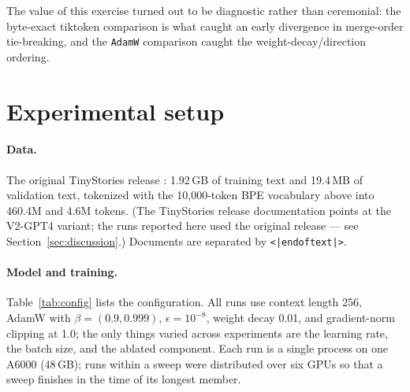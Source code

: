 \documentclass{article}
\newcommand{\eot}{\texttt{<|endoftext|>}}
\begin{document}
The value of this exercise turned out to be diagnostic rather than ceremonial: the byte-exact tiktoken comparison is what caught an early divergence in merge-order tie-breaking, and the \texttt{AdamW} comparison caught the weight-decay/direction ordering.

\section{Experimental setup}
\label{sec:setup}

\paragraph{Data.} The original TinyStories release \citep{tinystories}: 1.92\,GB of training text and 19.4\,MB of validation text, tokenized with the 10{,}000-token BPE vocabulary above into 460.4M and 4.6M tokens. (The TinyStories release documentation points at the V2-GPT4 variant; the runs reported here used the original release --- see Section~\ref{sec:discussion}.) Documents are separated by \eot{}.

\paragraph{Model and training.} Table~\ref{tab:config} lists the configuration. All runs use context length 256, AdamW with $\beta=(0.9, 0.999)$, $\epsilon=10^{-8}$, weight decay 0.01, and gradient-norm clipping at 1.0; the only things varied across experiments are the learning rate, the batch size, and the ablated component. Each run is a single process on one A6000 (48\,GB); runs within a sweep were distributed over six GPUs so that a sweep finishes in the time of its longest member.
\end{document}
